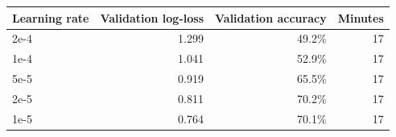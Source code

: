 \begin{tabular}{lrrr}
\toprule
Learning rate & Validation log-loss & Validation accuracy & Minutes \\
\midrule
2e-4 & 1.299 & 49.2\% & 17 \\
1e-4 & 1.041 & 52.9\% & 17 \\
5e-5 & 0.919 & 65.5\% & 17 \\
2e-5 & 0.811 & 70.2\% & 17 \\
1e-5 & 0.764 & 70.1\% & 17 \\
\bottomrule
\end{tabular}
